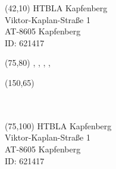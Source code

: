 \documentclass [8pt]{article}
\begin{document}
\pagestyle{empty}

{
\begin{textblock}{55}(42,10)
HTBLA Kapfenberg\\
Viktor-Kaplan-Straße 1\\
AT-8605 Kapfenberg\\
ID: 621417
\end{textblock}


\begin{textblock}{60}(75,80)
\NachrichtTyp, \Lehrer, \Klasse, \Schuler, \Jahr
\end{textblock}

\begin{textblock}{45}(150,65)
\AddrA\\
\AddrB\\
\AddrC\\
\AddrD
\end{textblock}


\begin{textblock}{55}(75,100)
HTBLA Kapfenberg\\
Viktor-Kaplan-Straße 1\\
AT-8605 Kapfenberg\\
ID: 621417
\end{textblock}


\newpage
}
\end{document}
